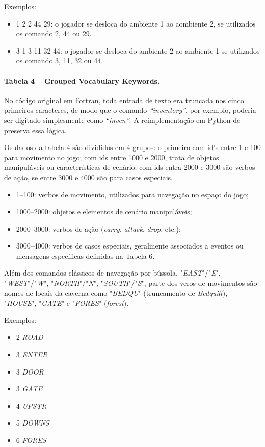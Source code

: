 \documentclass[12pt,a4paper]{article}
\begin{document}
Exemplos:
\begin{itemize}
  \item 1  2  2  44  29: o jogador se desloca do ambiente 1 ao aombiente 2, se utilizados os comando 2, 44 ou 29. 
  \item 3  1  3  11  32  44: o jogador se desloca do ambiente 2 ao ambiente 1 se utilizados os comando 3, 11, 32 ou 44.
\end{itemize}

\paragraph{Tabela 4 – Grouped Vocabulary Keywords.}
No código original em Fortran, toda entrada de texto era truncada nos cinco primeiros caracteres, de modo que o comando \textit{“inventory”}, por exemplo, poderia ser digitado simplesmente como \textit{“inven”}. A reimplementação em Python de \textcite{rhodes_adventure_py} preserva essa lógica.  

Os dados da tabela 4 são divididos em 4 grupos: o primeiro com id's entre 1 e 100 para movimento no jogo; com ids entre 1000 e 2000, trata de objetos manipuláveis ou características de cenário; com ids entra 2000 e 3000 são verbos de ação, se entre 3000 e 4000 são para casos especiais.

\begin{itemize}
  \item 1–100: verbos de movimento, utilizados para navegação no espaço do jogo;  
  \item 1000–2000: objetos e elementos de cenário manipuláveis;  
  \item 2000–3000: verbos de ação (\textit{carry}, \textit{attack}, \textit{drop}, etc.);  
  \item 3000–4000: verbos de casos especiais, geralmente associados a eventos ou mensagens específicas definidas na Tabela 6.  
\end{itemize}

Além dos comandos clássicos de navegação por bússola, "\textit{EAST}"/"\textit{E}", "\textit{WEST}"/"\textit{W}", "\textit{NORTH}"/"\textit{N}", "\textit{SOUTH}"/"\textit{S}", parte dos veros de movimentos são nomes de locais da caverna como "\textit{BEDQU}" (truncamento de \textit{Bedquilt}), "\textit{HOUSE}", "\textit{GATE}" e "\textit{FORES}" (\textit{forest}).

Exemplos:  
\begin{itemize}
    \item 2 \textit{ROAD}
    \item 3 \textit{ENTER}
    \item 3 \textit{DOOR}
    \item 3 \textit{GATE}
    \item 4 \textit{UPSTR}
    \item 5 \textit{DOWNS}
    \item 6 \textit{FORES}
\end{itemize}
\end{document}
